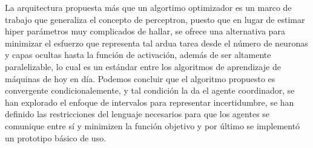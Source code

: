 \begin{conclusions}
    \label{sec:19}
        
            La arquitectura propuesta más que un algortimo optimizador es un marco de trabajo que generaliza el concepto de perceptron, puesto que en lugar de estimar 
            hiper parámetros muy complicados de hallar, se ofrece una alternativa para minimizar el esfuerzo que representa tal ardua tarea desde el número de neuronas y 
            capas ocultas hasta la función de activación, además de ser altamente paralelizable, lo cual es un estándar entre los algoritmos de aprendizaje de máquinas de 
            hoy en día. Podemos concluir que el algoritmo propuesto es convergente condicionalemente, y tal condición la da el agente coordinador, se han explorado 
            el enfoque de intervalos para representar incertidumbre, se han definido las restricciones del lenguaje necesarios para que los agentes se comunique entre sí y 
            minimizen la función objetivo y por último se implementó un prototipo básico de uso.    
\end{conclusions}
